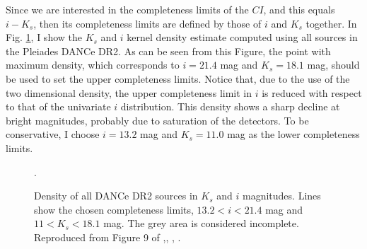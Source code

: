 Since we are interested in the completeness limits of the $CI$, and this equals $i -K_s$, then its completeness limits are defined by those of $i$ and $K_s$ together. In Fig. \ref{fig:completeness}, I show the $K_s$ and $i$ kernel density estimate computed using all sources in the Pleiades DANCe DR2. As can be seen from this Figure, the point with maximum density, which corresponds to $i=21.4$ mag and $K_s=18.1$ mag, should be used to set the upper completeness limits. Notice that, due to the use of the two dimensional density, the upper completeness limit in $i$ is reduced with respect to that of the univariate $i$ distribution. This density shows a sharp decline at bright magnitudes, probably due to saturation of the detectors. To be conservative, I choose $i=13.2$ mag and $K_s=11.0$ mag as the lower completeness limits.

\begin{figure}[htbp]
\begin{center}
\caption{Density of all DANCe DR2 sources in $K_s$ and $i$ magnitudes. Lines show the chosen completeness limits, $13.2<i<21.4$ mag and $11<K_s<18.1$ mag. The grey area is considered incomplete. Reproduced from Figure 9 of \citet{Olivares2017},\textit{}, , .}
\label{fig:completeness}.
\end{center}
\end{figure}

